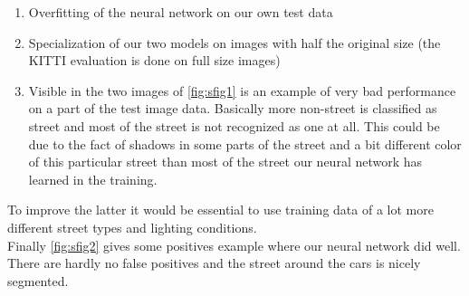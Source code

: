 \begin{enumerate}
    \item Overfitting of the neural network on our own test data
    \item Specialization of our two models on images with half the original
          size (the KITTI evaluation is done on full size images)
    \item Visible in the two images of \cref{fig:sfig1} is an example of very
          bad performance on a part of the test image data. Basically more
          non-street is classified as street and most of the street is not
          recognized as one at all. This could be due to the fact of shadows
          in some parts of the street and a bit different color of this
          particular street than most of the street our neural network has
          learned in the training.
\end{enumerate}
To improve the latter it would be essential to use training data of a lot more
different street types and lighting conditions.\\
Finally \cref{fig:sfig2} gives some positives example where our neural network
did well. There are hardly no false positives and the street around the cars is nicely
segmented.


